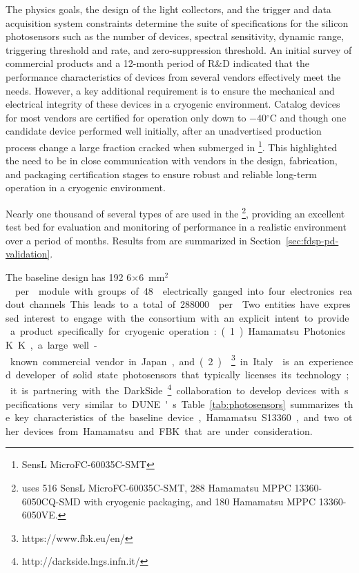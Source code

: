 
The physics goals, the design of the light collectors, and the trigger and data acquisition system constraints determine the suite of specifications for the silicon photosensors such as the number of devices, spectral sensitivity, dynamic range, triggering threshold and rate, and zero-suppression threshold. An initial survey of commercial products and a 12-month period of R\&D indicated that the performance characteristics of devices from several vendors effectively meet the  needs. 
However, a key additional requirement is to ensure the mechanical and electrical integrity of these devices in a cryogenic environment. Catalog devices for most vendors are certified for operation only down to \num{-40}$^\circ$C and though one candidate device performed well initially, after an unadvertised production process change a large fraction cracked when submerged in \footnote{SensL MicroFC-60035C-SMT}. This highlighted the need to be in close communication with vendors in the 
 design, fabrication, and packaging certification stages to ensure 
robust and reliable long-term operation in a cryogenic environment. 

Nearly one thousand of several types of  are used in the  \footnote{  uses 516 SensL MicroFC-60035C-SMT, 288 Hamamatsu MPPC 13360-6050CQ-SMD with cryogenic packaging, and 180 Hamamatsu MPPC 13360-6050VE.}, providing an excellent test bed for evaluation and monitoring of  performance in a realistic environment over a period of months. Results from  are summarized in Section~\ref{sec:fdsp-pd-validation}.

The baseline  design has \num{192} \num{6}$\times$\SI{6}{mm$^2$}  per  module with groups of \num{48}  electrically ganged into four electronics readout channels. This leads to a total of \num{288000}  per . 

Two entities have expressed interest to engage with the consortium with an explicit intent to provide a product specifically for cryogenic operation: (1) Hamamatsu Photonics K.K., a large well-known commercial vendor in Japan, and (2) \footnote{https://www.fbk.eu/en/}
in Italy. 
 is an experienced developer of solid state photosensors that typically licenses its technology; it is partnering with the DarkSide\footnote{http://darkside.lngs.infn.it/} collaboration to develop devices with specifications very similar to DUNE's.  Table~\ref{tab:photosensors} summarizes the key characteristics of the baseline device, Hamamatsu S13360, and two other devices from Hamamatsu and FBK that are under consideration.

